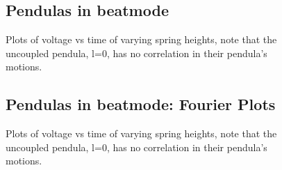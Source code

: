 \documentclass{article}
\begin{document}
\FloatBarrier

\begin{figure}[p]
\subsection{Pendulas in beatmode}
    \centering
    \scalebox{0.52}{}
    \hspace{0.5cm}
    \scalebox{0.52}{}
  
    \vspace{0.5cm}
  
    \scalebox{0.52}{}
    \hspace{0.5cm}
    \scalebox{0.52}{}
  
    \vspace{0.5cm}
  
    \scalebox{0.52}{}
    \hspace{0.5cm}
    \scalebox{0.52}{}
  
    \caption{Plots of voltage vs time of varying spring heights, note 
    that the uncoupled pendula, l=0, has no correlation in their 
    pendula's motions.}
\end{figure}

\FloatBarrier

\begin{figure}[p]
\subsection{Pendulas in beatmode: Fourier Plots}
    \centering
    \scalebox{0.52}{}
    \hspace{0.5cm}
    \scalebox{0.52}{}
  
    \vspace{0.5cm}
  
    \scalebox{0.52}{}
    \hspace{0.5cm}
    \scalebox{0.52}{}
  
    \vspace{0.5cm}
  
    \scalebox{0.52}{}
    \hspace{0.5cm}
    \scalebox{0.52}{}
  
    \caption{Plots of voltage vs time of varying spring heights, note 
    that the uncoupled pendula, l=0, has no correlation in their 
    pendula's motions.}
\end{figure}
\end{document}
